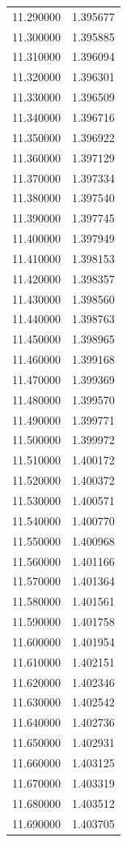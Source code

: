 \begin{tabular}{rr}
11.290000 & 1.395677 \\
11.300000 & 1.395885 \\
11.310000 & 1.396094 \\
11.320000 & 1.396301 \\
11.330000 & 1.396509 \\
11.340000 & 1.396716 \\
11.350000 & 1.396922 \\
11.360000 & 1.397129 \\
11.370000 & 1.397334 \\
11.380000 & 1.397540 \\
11.390000 & 1.397745 \\
11.400000 & 1.397949 \\
11.410000 & 1.398153 \\
11.420000 & 1.398357 \\
11.430000 & 1.398560 \\
11.440000 & 1.398763 \\
11.450000 & 1.398965 \\
11.460000 & 1.399168 \\
11.470000 & 1.399369 \\
11.480000 & 1.399570 \\
11.490000 & 1.399771 \\
11.500000 & 1.399972 \\
11.510000 & 1.400172 \\
11.520000 & 1.400372 \\
11.530000 & 1.400571 \\
11.540000 & 1.400770 \\
11.550000 & 1.400968 \\
11.560000 & 1.401166 \\
11.570000 & 1.401364 \\
11.580000 & 1.401561 \\
11.590000 & 1.401758 \\
11.600000 & 1.401954 \\
11.610000 & 1.402151 \\
11.620000 & 1.402346 \\
11.630000 & 1.402542 \\
11.640000 & 1.402736 \\
11.650000 & 1.402931 \\
11.660000 & 1.403125 \\
11.670000 & 1.403319 \\
11.680000 & 1.403512 \\
11.690000 & 1.403705 \\

\end{tabular}
